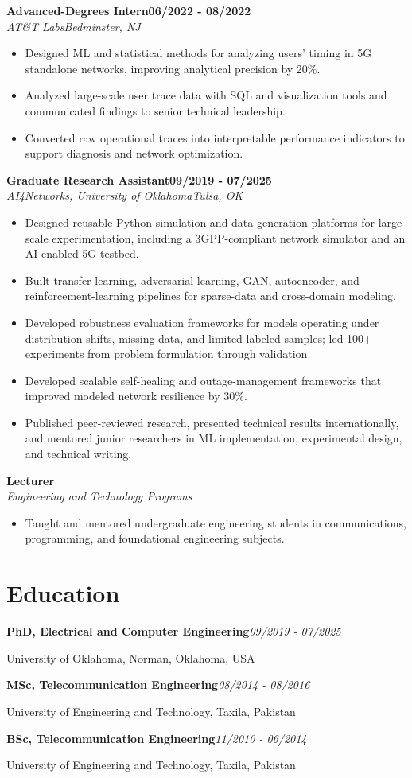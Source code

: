 \documentclass[9pt,letterpaper]{extarticle}
\newcommand{\role}[4]{%
  \Needspace{4\baselineskip}\textbf{#1}\hfill\textbf{#2}\\[-1pt]
  \textit{#3}\hfill\textit{#4}\par}
\newcommand{\entry}[2]{\Needspace{4\baselineskip}\textbf{#1}\hfill\textit{#2}\par}
\begin{document}
\role{Advanced-Degrees Intern}{06/2022 - 08/2022}{AT\&T Labs}{Bedminster, NJ}
\begin{itemize}
\item Designed ML and statistical methods for analyzing users' timing in 5G standalone networks, improving analytical precision by 20\%.
\item Analyzed large-scale user trace data with SQL and visualization tools and communicated findings to senior technical leadership.
\item Converted raw operational traces into interpretable performance indicators to support diagnosis and network optimization.
\end{itemize}
\role{Graduate Research Assistant}{09/2019 - 07/2025}{AI4Networks, University of Oklahoma}{Tulsa, OK}
\begin{itemize}
\item Designed reusable Python simulation and data-generation platforms for large-scale experimentation, including a 3GPP-compliant network simulator and an AI-enabled 5G testbed.
\item Built transfer-learning, adversarial-learning, GAN, autoencoder, and reinforcement-learning pipelines for sparse-data and cross-domain modeling.
\item Developed robustness evaluation frameworks for models operating under distribution shifts, missing data, and limited labeled samples; led 100+ experiments from problem formulation through validation.
\item Developed scalable self-healing and outage-management frameworks that improved modeled network resilience by 30\%.
\item Published peer-reviewed research, presented technical results internationally, and mentored junior researchers in ML implementation, experimental design, and technical writing.
\end{itemize}
\role{Lecturer}{}{Engineering and Technology Programs}{}
\begin{itemize}
\item Taught and mentored undergraduate engineering students in communications, programming, and foundational engineering subjects.
\end{itemize}
\section{Education}
\entry{PhD, Electrical and Computer Engineering}{09/2019 - 07/2025}
University of Oklahoma, Norman, Oklahoma, USA\par
\entry{MSc, Telecommunication Engineering}{08/2014 - 08/2016}
University of Engineering and Technology, Taxila, Pakistan\par
\entry{BSc, Telecommunication Engineering}{11/2010 - 06/2014}
University of Engineering and Technology, Taxila, Pakistan\par
{}
\end{document}
